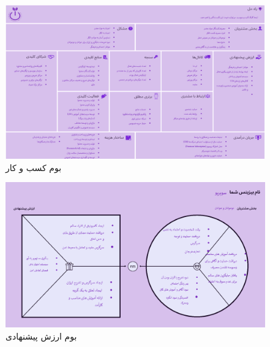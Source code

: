 \documentclass[dvipsnames, svgnames, x11names, 11pt]{article}
\begin{document}
\begin{figure}[b]
\begin{center}
\includegraphics[scale=0.7, angle=90]{images/canvas1}
\end{center}
\caption{بوم کسب و کار}
\label{fig:lean-canvas}
\end{figure}


\begin{figure}[b]
\begin{center}
\includegraphics[scale=0.7, angle=90]{images/canvas2}
\end{center}
\caption{بوم ارزش پیشنهادی}
\label{fig:value-proposed}
\end{figure}
\end{document}
